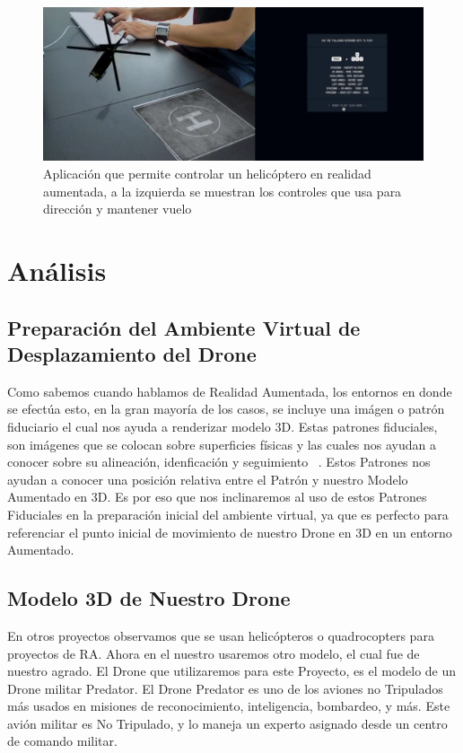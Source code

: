 \documentclass[a4paper]{article}
\begin{document}
\begin{figure}[h!]
  \centering
  \includegraphics[width=0.95\linewidth, keepaspectratio]{helicopteroAR}
  \caption{Aplicación que permite controlar un helicóptero en realidad aumentada, a la izquierda se muestran los controles que usa para dirección y mantener vuelo}
  \label{fig:Helicoptero AR}
\end{figure}

\section{Análisis}

\subsection{Preparación del Ambiente Virtual de Desplazamiento del Drone}
Como sabemos cuando hablamos de Realidad Aumentada, los entornos en donde se efectúa esto, en la gran mayoría de los casos, se incluye una imágen o patrón fiduciario el cual nos ayuda a renderizar modelo 3D. Estas patrones fiduciales, son imágenes que se colocan sobre superficies físicas y las cuales nos ayudan a conocer sobre su alineación, idenficación y seguimiento ~\cite{bestfiducial}. Estos Patrones nos ayudan a conocer una posición relativa entre el Patrón y nuestro Modelo Aumentado en 3D. Es por eso que nos inclinaremos al uso de estos Patrones Fiduciales en la preparación inicial del ambiente virtual, ya que es perfecto para referenciar el punto inicial de movimiento de nuestro Drone en 3D en un entorno Aumentado.

\subsection{Modelo 3D de Nuestro Drone}
En otros proyectos observamos que se usan helicópteros o quadrocopters para proyectos de RA. Ahora en el nuestro usaremos otro modelo, el cual fue de nuestro agrado. El Drone que utilizaremos para este Proyecto, es el modelo de un Drone militar Predator. El Drone Predator es uno de los aviones no Tripulados más usados en misiones de reconocimiento, inteligencia, bombardeo, y más. Este avión militar es No Tripulado, y lo maneja un experto asignado desde un centro de comando militar. 
\end{document}
